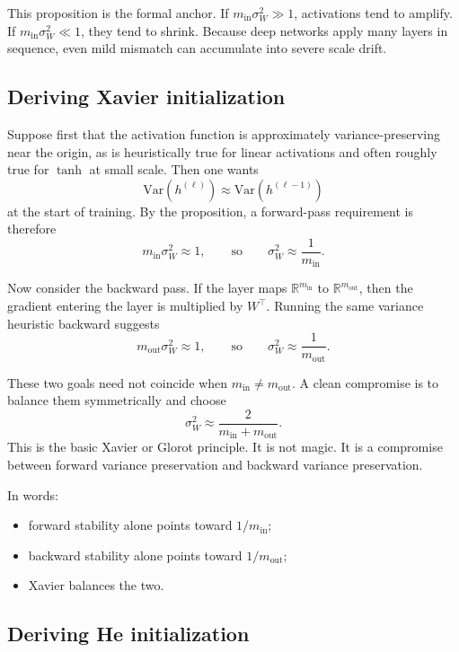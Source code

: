 This proposition is the formal anchor.
If $m_{\mathrm{in}}\sigma_W^2\gg 1$, activations tend to amplify.
If $m_{\mathrm{in}}\sigma_W^2\ll 1$, they tend to shrink.
Because deep networks apply many layers in sequence, even mild mismatch can accumulate into severe scale drift.

\subsection*{Deriving Xavier initialization}

Suppose first that the activation function is approximately variance-preserving near the origin, as is heuristically true for linear activations and often roughly true for $\tanh$ at small scale.
Then one wants
\[
\mathrm{Var}(h^{(\ell)})\approx \mathrm{Var}(h^{(\ell-1)})
\]
at the start of training.
By the proposition, a forward-pass requirement is therefore
\[
m_{\mathrm{in}}\sigma_W^2 \approx 1,
\qquad\text{so}
\qquad
\sigma_W^2 \approx \frac{1}{m_{\mathrm{in}}}.
\]

\medskip

Now consider the backward pass.
If the layer maps $\mathbb R^{m_{\mathrm{in}}}$ to $\mathbb R^{m_{\mathrm{out}}}$, then the gradient entering the layer is multiplied by $W^\top$.
Running the same variance heuristic backward suggests
\[
m_{\mathrm{out}}\sigma_W^2 \approx 1,
\qquad\text{so}
\qquad
\sigma_W^2 \approx \frac{1}{m_{\mathrm{out}}}.
\]

\medskip

These two goals need not coincide when $m_{\mathrm{in}}\neq m_{\mathrm{out}}$.
A clean compromise is to balance them symmetrically and choose
\[
\sigma_W^2 \approx \frac{2}{m_{\mathrm{in}}+m_{\mathrm{out}}}.
\]
This is the basic Xavier or Glorot principle.
It is not magic.
It is a compromise between forward variance preservation and backward variance preservation.

\medskip

In words:
\begin{itemize}
    \item forward stability alone points toward $1/m_{\mathrm{in}}$;
    \item backward stability alone points toward $1/m_{\mathrm{out}}$;
    \item Xavier balances the two.
\end{itemize}

\subsection*{Deriving He initialization}


